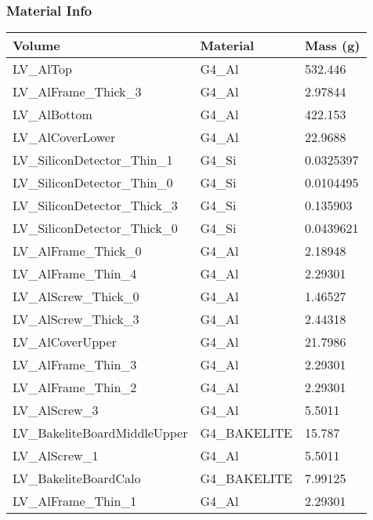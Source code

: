 \documentclass[8pt]{beamer}
\begin{document}
            \begin{frame}
                \frametitle{Material Info}
            
            \begin{table}
            \begin{tabular}{lll}
             Volume & Material & Mass (g) \\
                    
            \midrule
            LV\_AlTop & G4\_Al & 532.446\\
                        LV\_AlFrame\_Thick\_3 & G4\_Al & 2.97844\\
                        LV\_AlBottom & G4\_Al & 422.153\\
                        LV\_AlCoverLower & G4\_Al & 22.9688\\
                        LV\_SiliconDetector\_Thin\_1 & G4\_Si & 0.0325397\\
                        LV\_SiliconDetector\_Thin\_0 & G4\_Si & 0.0104495\\
                        LV\_SiliconDetector\_Thick\_3 & G4\_Si & 0.135903\\
                        LV\_SiliconDetector\_Thick\_0 & G4\_Si & 0.0439621\\
                        LV\_AlFrame\_Thick\_0 & G4\_Al & 2.18948\\
                        LV\_AlFrame\_Thin\_4 & G4\_Al & 2.29301\\
                        LV\_AlScrew\_Thick\_0 & G4\_Al & 1.46527\\
                        LV\_AlScrew\_Thick\_3 & G4\_Al & 2.44318\\
                        LV\_AlCoverUpper & G4\_Al & 21.7986\\
                        LV\_AlFrame\_Thin\_3 & G4\_Al & 2.29301\\
                        LV\_AlFrame\_Thin\_2 & G4\_Al & 2.29301\\
                        LV\_AlScrew\_3 & G4\_Al & 5.5011\\
                        LV\_BakeliteBoardMiddleUpper & G4\_BAKELITE & 15.787\\
                        LV\_AlScrew\_1 & G4\_Al & 5.5011\\
                        LV\_BakeliteBoardCalo & G4\_BAKELITE & 7.99125\\
                        LV\_AlFrame\_Thin\_1 & G4\_Al & 2.29301\\

\end{tabular}
\end{table}
\end{frame}
\end{document}
